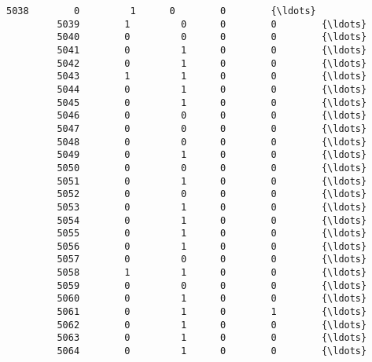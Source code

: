 \documentclass[11pt]{article}
\begin{document}
\begin{Verbatim}[commandchars=\\\{\}]
         5038        0         1      0        0        {\ldots}          
         5039        1         0      0        0        {\ldots}          
         5040        0         0      0        0        {\ldots}          
         5041        0         1      0        0        {\ldots}          
         5042        0         1      0        0        {\ldots}          
         5043        1         1      0        0        {\ldots}          
         5044        0         1      0        0        {\ldots}          
         5045        0         1      0        0        {\ldots}          
         5046        0         0      0        0        {\ldots}          
         5047        0         0      0        0        {\ldots}          
         5048        0         0      0        0        {\ldots}          
         5049        0         1      0        0        {\ldots}          
         5050        0         0      0        0        {\ldots}          
         5051        0         1      0        0        {\ldots}          
         5052        0         0      0        0        {\ldots}          
         5053        0         1      0        0        {\ldots}          
         5054        0         1      0        0        {\ldots}          
         5055        0         1      0        0        {\ldots}          
         5056        0         1      0        0        {\ldots}          
         5057        0         0      0        0        {\ldots}          
         5058        1         1      0        0        {\ldots}          
         5059        0         0      0        0        {\ldots}          
         5060        0         1      0        0        {\ldots}          
         5061        0         1      0        1        {\ldots}          
         5062        0         1      0        0        {\ldots}          
         5063        0         1      0        0        {\ldots}          
         5064        0         1      0        0        {\ldots}          
         

\end{Verbatim}
\end{document}

